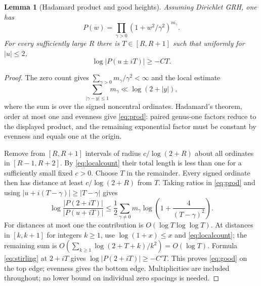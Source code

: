 \documentclass[11pt]{article}
\newtheorem{lemma}[theorem]{Lemma}
\theoremstyle{definition}\newtheorem{definition}[theorem]{Definition}
\theoremstyle{remark}\newtheorem{remark}[theorem]{Remark}
\begin{document}
\begin{lemma}[Hadamard product and good heights]\label{lem:heights}
Assuming Dirichlet GRH, one has
\begin{equation}\label{eq:prod}
 P(w)=\prod_{\gamma>0}(1+w^2/\gamma^2)^{m_\gamma}.
\end{equation}
For every sufficiently large $R$ there is $T\in[R,R+1]$ such that uniformly for $|u|\le2$,
\begin{equation}\label{eq:good} \log|P(u\pm iT)|\ge -C T .\end{equation}
\end{lemma}
\begin{proof}
The zero count gives $\sum_{\gamma>0}m_\gamma/\gamma^2<\infty$ and the local estimate
\begin{equation}\label{eq:localcount}
 \sum_{|\gamma-y|\le1}m_\gamma\ll\log(2+|y|),
\end{equation}
where the sum is over the signed noncentral ordinates. Hadamard's theorem, order at most one and evenness give \eqref{eq:prod}: paired genus-one factors reduce to the displayed product, and the remaining exponential factor must be constant by evenness and equals one at the origin.

Remove from $[R,R+1]$ intervals of radius $c/\log(2+R)$ about all ordinates in $[R-1,R+2]$. By \eqref{eq:localcount} their total length is less than one for a sufficiently small fixed $c>0$. Choose $T$ in the remainder. Every signed ordinate then has distance at least $c/\log(2+R)$ from $T$. Taking ratios in \eqref{eq:prod} and using $|u+i(T-\gamma)|\ge|T-\gamma|$ gives
\[
 \log\frac{|P(2+iT)|}{|P(u+iT)|}
 \le\frac12\sum_{\gamma\ne0}m_\gamma\log\left(1+\frac4{(T-\gamma)^2}\right).
\]
For distances at most one the contribution is $O(\log T\log\log T)$. At distances in $[k,k+1]$ for integers $k\ge1$, use $\log(1+x)\le x$ and \eqref{eq:localcount}; the remaining sum is $O(\sum_{k\ge1}\log(2+T+k)/k^2)=O(\log T)$. Formula \eqref{eq:stirling} at $2+iT$ gives $\log|P(2+iT)|\ge-C'T$. This proves \eqref{eq:good} on the top edge; evenness gives the bottom edge. Multiplicities are included throughout; no lower bound on individual zero spacings is needed.
\end{proof}
\end{document}
